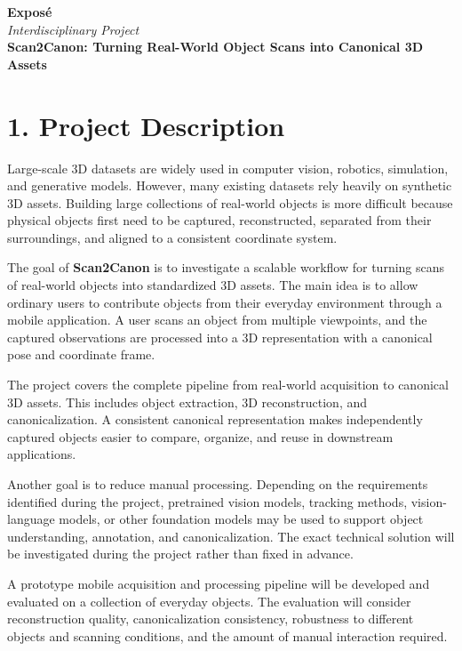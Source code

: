 \documentclass[11pt,a4paper]{article}
\begin{document}
\begin{center}
    {\Large \textbf{Exposé}}\\[0.15em]
    {\large \textit{Interdisciplinary Project}}\\[0.8em]
    {\LARGE \textbf{Scan2Canon: Turning Real-World Object Scans into Canonical 3D Assets}}
\end{center}

\section{1. Project Description}

Large-scale 3D datasets are widely used in computer vision, robotics, simulation, and generative models. However, many existing datasets rely heavily on synthetic 3D assets. Building large collections of real-world objects is more difficult because physical objects first need to be captured, reconstructed, separated from their surroundings, and aligned to a consistent coordinate system.

The goal of \textbf{Scan2Canon} is to investigate a scalable workflow for turning scans of real-world objects into standardized 3D assets. The main idea is to allow ordinary users to contribute objects from their everyday environment through a mobile application. A user scans an object from multiple viewpoints, and the captured observations are processed into a 3D representation with a canonical pose and coordinate frame.

The project covers the complete pipeline from real-world acquisition to canonical 3D assets. This includes object extraction, 3D reconstruction, and canonicalization. A consistent canonical representation makes independently captured objects easier to compare, organize, and reuse in downstream applications.

Another goal is to reduce manual processing. Depending on the requirements identified during the project, pretrained vision models, tracking methods, vision-language models, or other foundation models may be used to support object understanding, annotation, and canonicalization. The exact technical solution will be investigated during the project rather than fixed in advance.

A prototype mobile acquisition and processing pipeline will be developed and evaluated on a collection of everyday objects. The evaluation will consider reconstruction quality, canonicalization consistency, robustness to different objects and scanning conditions, and the amount of manual interaction required.
\end{document}
